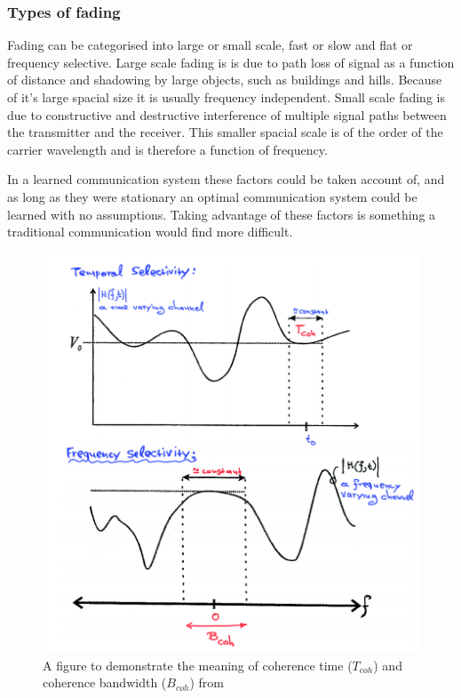 \documentclass[12pt,onecolumn,letterpaper]{article}
\newcommand\genfigsize{0.5}
\begin{document}
\subsubsection{Types of fading}

Fading can be categorised into large or small scale, fast or slow and flat or frequency selective. Large scale fading is is due to path loss of signal as a function of distance and shadowing by large objects, such as buildings and hills. Because of it's large spacial size it is usually frequency independent. Small scale fading is due to constructive and destructive interference of multiple signal paths between the transmitter and the receiver. This smaller spacial scale is of the order of the carrier wavelength and is therefore a function of frequency. 

In a learned communication system these factors could be taken account of, and as long as they were stationary an optimal communication system could be learned with no assumptions. Taking advantage of these factors is something a traditional communication would find more difficult.

\begin{figure}[t]
   \centering
   \includegraphics[width=\genfigsize\linewidth]{figures/time_freq_coherence.PNG}
   \caption{A figure to demonstrate the meaning of coherence time ($T_{coh}$) and coherence bandwidth ($B_{coh}$) from~\cite{EE3CommsSystemsNotesL4}}
\label{fig:coherence_illus}
\end{figure}
\end{document}

